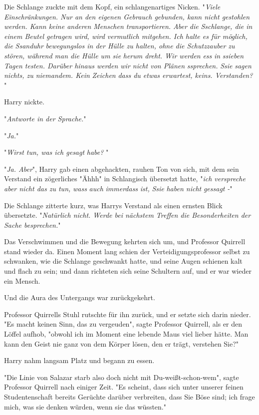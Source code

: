{Die Schlange zuckte mit dem Kopf, ein schlangenartiges Nicken. "\emph{Viele Einschränkungen. Nur an den eigenen Gebrauch gebunden, kann nicht gestohlen werden. Kann keine anderen Menschen transportieren. Aber die} \emph{Sschlange, die in einem Beutel getragen wird, wird vermutlich mitgehen. Ich halte es für möglich, die} \emph{Ssanduhr} \emph{bewegungslos in der Hülle zu halten, ohne die Schutzzauber zu stören, während man die Hülle um sie} \emph{herum dreht. Wir werden} \emph{ess} \emph{in} \emph{ssieben} \emph{Tagen testen. Darüber hinaus werden wir nicht von Plänen} \emph{ssprechen.} \emph{Ssie} \emph{sagen nichts, zu niemandem. Kein} \emph{Zeichen} \emph{dass du etwas erwartest, keins. Verstanden?} "

Harry nickte.

"\emph{Antworte in der Sprache.}"

"\emph{Ja.}"

"\emph{Wirst tun, was ich gesagt} \emph{habe?} "

"\emph{Ja. Aber}", Harry gab einen abgehackten, rauhen Ton von sich, mit dem sein Verstand ein zögerliches "Ähhh" in Schlangisch übersetzt hatte, "\emph{ich verspreche aber nicht das zu tun,} \emph{wass} \emph{auch} \emph{immerdass} \emph{ist,} \emph{Ssie} \emph{haben nicht} \emph{gessagt} \emph{-}"

Die Schlange zitterte kurz, was Harrys Verstand als einen ernsten Blick übersetzte. "\emph{Natürlich nicht. Werde bei nächstem Treffen die Besonderheiten der Sache besprechen.}"

Das Verschwimmen und die Bewegung kehrten sich um, und Professor Quirrell stand wieder da. Einen Moment lang schien der Verteidigungsprofessor selbst zu schwanken, wie die Schlange geschwankt hatte, und seine Augen schienen kalt und flach zu sein; und dann richteten sich seine Schultern auf, und er war wieder ein Mensch.

Und die Aura des Untergangs war zurückgekehrt.

Professor Quirrells Stuhl rutschte für ihn zurück, und er setzte sich darin nieder. "Es macht keinen Sinn, das zu vergeuden", sagte Professor Quirrell, als er den Löffel aufhob, "obwohl ich im Moment eine lebende Maus viel lieber hätte. Man kann den Geist nie ganz von dem Körper lösen, den er trägt, verstehen Sie?"

Harry nahm langsam Platz und begann zu essen.

"Die Linie von Salazar starb also doch nicht mit Du-weißt-schon-wem", sagte Professor Quirrell nach einiger Zeit. "Es scheint, dass sich unter unserer feinen Studentenschaft bereits Gerüchte darüber verbreiten, dass Sie Böse sind; ich frage mich, was sie denken würden, wenn sie das wüssten."

}
